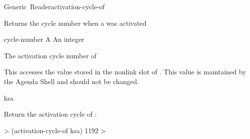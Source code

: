 \documentclass[10pt,twoside,english,pdftex]{article}
\begin{document}
\begin{functiondoc}{Generic~Reader}{activation-cycle-of}{ 
    }
%
%

\fnsyntax

\fnpurpose Returns the cycle number when a  was activated

\fnmethods
{}

\fnpackage {}

\fnmodule {}

\fnargs
\begin{args}{cycle-number}
\arg[ksa] A 
 An integer
\end{args}

\fnreturns The activation cycle number of 
  
\fndescription 
This  accesses the value stored in the 
 nonlink slot of .  This value is
maintained by the Agenda Shell and should not be changed.

\begin{alsos}{ksa}
\also[ksa]
\end{alsos}

\fnexample
Return the activation cycle of :
%
\W\supp
\begin{example}
  > (activation-cycle-of ksa)
  1192
  >
\end{example}

\end{functiondoc}

\end{document}
